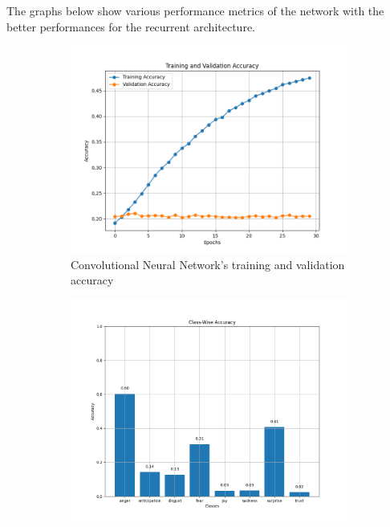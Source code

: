 The graphs below show various performance metrics of the network with the better
performances for the recurrent architecture.
\begin{figure}[H]
    \centering
    \begin{subfigure}{0.48\textwidth}
        \includegraphics[width=\textwidth]{pictures/cnn_accuracy.png}
        \caption{Convolutional Neural Network's training and validation accuracy}
        \label{fig:rnn_train_val_acc}
    \end{subfigure}
    \begin{subfigure}{0.5\textwidth}
        \includegraphics[width=\textwidth]{pictures/cnn_class_accuracy.png}

\end{subfigure}
\end{figure}
